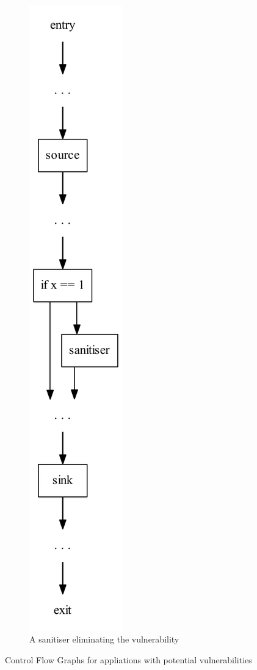 \begin{figure}
\begin{subfigure}[b]{0.5\textwidth}
  \end{subfigure}
  ~
  \begin{subfigure}[b]{0.5\textwidth}
    \centering
    \includegraphics[scale=0.8]{figures/dot_files/sanitised_with_flow.pdf}
    \caption{A sanitiser eliminating the vulnerability}
    \label{vulnerabilities_sanitised}
  \end{subfigure}
  
  \caption{Control Flow Graphs for appliations with potential vulnerabilities}
\end{figure}

